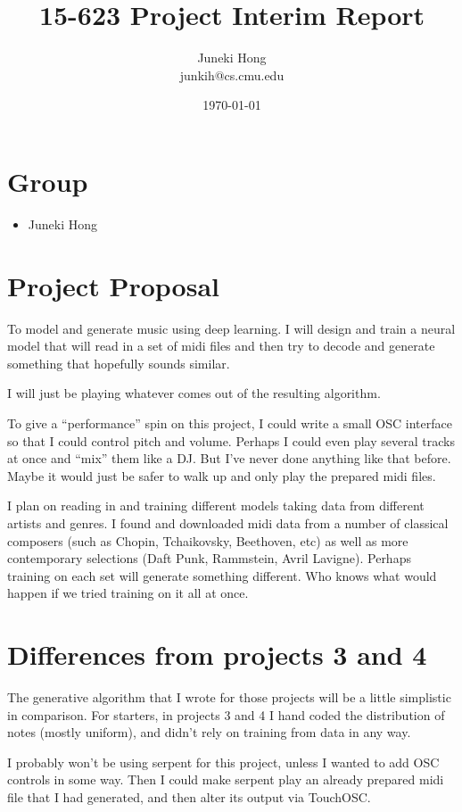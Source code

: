 \documentclass[12pt]{article}
\title{15-623 Project Interim Report}
\author{Juneki Hong \\
  junkih@cs.cmu.edu\\
}
\date{\today}
\begin{document}
\maketitle

\section{Group}
\begin{itemize}
\item Juneki Hong
\end{itemize}

\section{Project Proposal}

To model and generate music using deep learning.
I will design and train a neural model that will read in a set of midi files and then try to decode and generate something that hopefully sounds similar.

I will just be playing whatever comes out of the resulting algorithm.

To give a ``performance'' spin on this project, I could write a small OSC interface so that I could control pitch and volume. Perhaps I could even play several tracks at once and ``mix'' them like a DJ. But I've never done anything like that before.
Maybe it would just be safer to walk up and only play the prepared midi files.

I plan on reading in and training different models taking data from different artists and genres. I found and downloaded midi data from a number of classical composers (such as Chopin, Tchaikovsky, Beethoven, etc) as well as more contemporary selections (Daft Punk, Rammstein, Avril Lavigne).
Perhaps training on each set will generate something different. Who knows what would happen if we tried training on it all at once.



\section{Differences from projects 3 and 4}

The generative algorithm that I wrote for those projects will be a little simplistic in comparison. For starters, in projects 3 and 4 I hand coded the distribution of notes (mostly uniform), and didn't rely on training from data in any way.

I probably won't be using serpent for this project, unless I wanted to add OSC controls in some way. Then I could make serpent play an already prepared midi file that I had generated, and then alter its output via TouchOSC.
\end{document}
